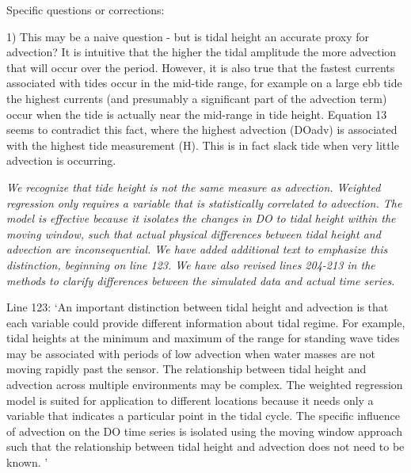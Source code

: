 \documentclass[letterpaper,12pt]{article}\usepackage[]{graphicx}\usepackage[]{color}
\begin{document}
Specific questions or corrections:

1) This may be a naive question -  but is tidal height an accurate proxy for advection? It is intuitive that the higher the tidal amplitude the more advection that will occur over the period. However, it is also true that the fastest currents associated with tides occur in the mid-tide range, for example on a large ebb tide the highest currents (and presumably a significant part of the advection term) occur when the tide is actually near the mid-range in tide height. Equation 13 seems to contradict this fact, where the highest advection (DOadv) is associated with the highest tide measurement (H). This is in fact slack tide when very little advection is occurring.

{\it We recognize that tide height is not the same measure as advection.  Weighted regression only requires a variable that is statistically correlated to advection.  The model is effective because it isolates the changes in DO to tidal height within the moving window, such that actual physical differences between tidal height and advection are inconsequential.  We have added additional text to emphasize this distinction, beginning on line 123.  We have also revised lines 204-213 in the methods to clarify differences between the simulated data and actual time series.

Line 123: `An important distinction between tidal height and advection is that each variable could provide different information about tidal regime.  For example, tidal heights at the minimum and maximum of the range for standing wave tides may be associated with periods of low advection when water masses are not moving rapidly past the sensor.  The relationship between tidal height and advection across multiple environments may be complex.  The weighted regression model is suited for application to different locations because it needs only a variable that indicates a particular point in the tidal cycle.  The specific influence of advection on the DO time series is isolated using the moving window approach such that the relationship between tidal height and advection does not need to be known.
'

}
\end{document}
